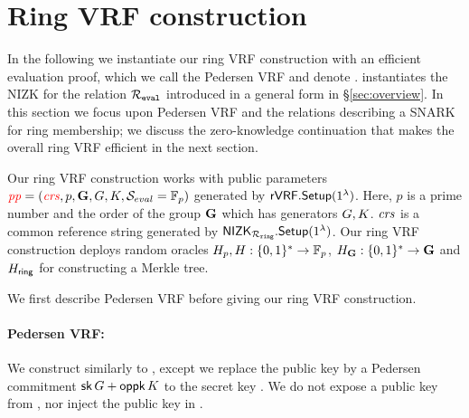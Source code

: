 \section{Ring VRF construction}%
\label{sec:pederson_vrf}

In the following we instantiate our ring VRF construction with an efficient evaluation proof, which
we call the Pedersen VRF and denote \PedVRF.
\PedVRF instantiates the NIZK for the relation $\mathcal{R}_{\mathtt{eval}}$ introduced in a general form 
in \S\ref{sec:overview}. In this section we focus upon Pedersen VRF and the relations 
describing a SNARK for ring membership; we discuss the zero-knowledge continuation
that makes the overall ring VRF efficient in the next section.

Our ring VRF construction works with public parameters $ {\color{red}\mathit{pp}} = ({\color{red}\mathit{crs}}, p,{\mathbf{G}}, G,K, {\mathcal{S}}_{eval}  = \mathbb{F}_p)$ generated by $ {\mathsf{rVRF}}.{\mathsf{Setup}}(1^\lambda) $. Here, $ p $ is a prime number and the order of the group $ {\mathbf{G}} $ which has generators $ G,K $. {\color{red} $ \mathit{crs} $} is a common reference string generated by $ {\mathsf{NIZK}}_{\mathcal{R}_{\mathtt{ring}}}.{\mathsf{Setup}}(1^\lambda) $. Our ring VRF construction deploys random oracles $H_p,H: \{0,1\}^* \to \mathbb{F}_p$, $H_{{\mathbf{G}}}: \{0,1\}^* \to {\mathbf{G}}$ and $ H_{\mathsf{ring}} $ for constructing a Merkle tree.

We first describe Pedersen VRF before giving our ring VRF construction.
\paragraph{Pedersen VRF:} 
We construct \PedVRF similarly to 
\cite{nsec5,VXEd25519,draft-irtf-cfrg-vrf-10},
except we replace the public key by a Pedersen commitment
$\mathsf{sk} \, G + \mathsf{oppk} \, K$ to the secret key \sk.
We do not expose a public key from \KeyGen, nor inject the public key in \Eval.


